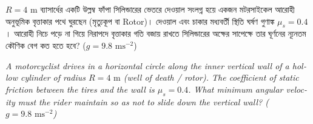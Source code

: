 \documentclass[12pt, a4paper]{article}
\begin{document}
\begin{tcolorbox}[questionbox={প্রশ্ন (Question) 40}]
\noindent
$R = 4\text{ m}$ ব্যাসার্ধের একটি উল্লম্ব ফাঁপা সিলিন্ডারের ভেতরে দেওয়াল সংলগ্ন হয়ে একজন মটরসাইকেল আরোহী অনুভূমিক বৃত্তাকার পথে ঘুরছেন (মৃত্যুকূপ বা Rotor)। দেওয়াল এবং চাকার মধ্যবর্তী স্থিতি ঘর্ষণ গুণাঙ্ক $\mu_s = 0.4$। আরোহী নিচে পড়ে না গিয়ে নিরাপদে বৃত্তাকার গতি বজায় রাখতে সিলিন্ডারের অক্ষের সাপেক্ষে তার ঘূর্ণনের ন্যূনতম কৌণিক বেগ কত হতে হবে? ($g = 9.8\text{ ms}^{-2}$)

\vspace{0.8em}
\begin{english}
\noindent\textit{\color{darkgray}
A motorcyclist drives in a horizontal circle along the inner vertical wall of a hollow cylinder of radius $R = 4\text{ m}$ (well of death / rotor). The coefficient of static friction between the tires and the wall is $\mu_s = 0.4$. What minimum angular velocity must the rider maintain so as not to slide down the vertical wall? ($g = 9.8\text{ ms}^{-2}$)
}
\end{english}
\end{tcolorbox}
\end{document}
